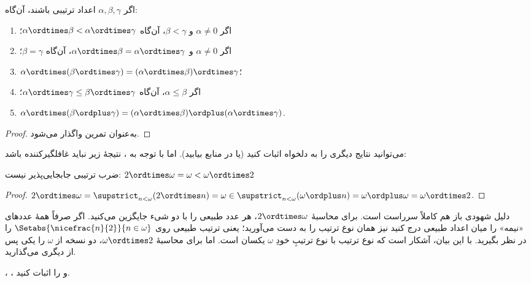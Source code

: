 \documentclass[../../../include/open-logic-section]{subfiles}
\begin{document}
\begin{lem}
اگر $\alpha, \beta, \gamma$ اعداد ترتیبی باشند، آن‌گاه:
\begin{enumerate}
	\item{} اگر $\alpha \neq 0$ و
	$\beta < \gamma$، آن‌گاه
	$\alpha \ordtimes \beta < \alpha \ordtimes \gamma$؛
	\item{} اگر $\alpha \neq 0$ و
	$\alpha \ordtimes \beta = \alpha\ordtimes\gamma$، آن‌گاه
	$\beta = \gamma$؛
	\item{}
	$\alpha \ordtimes (\beta \ordtimes \gamma) =
	(\alpha \ordtimes \beta) \ordtimes \gamma$؛
	\item{} اگر $\alpha \leq \beta$، آن‌گاه
	$\alpha \ordtimes \gamma \leq \beta \ordtimes \gamma$؛
	\item{}
	$\alpha \ordtimes (\beta \ordplus \gamma) =
	(\alpha \ordtimes \beta )\ordplus
	(\alpha\ordtimes \gamma)$.
\end{enumerate}
\end{lem}

\begin{proof}
به‌عنوان تمرین واگذار می‌شود.
\end{proof}

می‌توانید نتایج دیگری را به دلخواه اثبات کنید (یا در منابع
بیابید). اما با توجه به
، نتیجهٔ زیر نباید
غافلگیرکننده باشد:

\begin{prop}
ضرب ترتیبی جابجایی‌پذیر نیست:
$2 \ordtimes \omega = \omega < \omega \ordtimes 2$
\end{prop}

\begin{proof}
$2 \ordtimes \omega = \supstrict_{n < \omega}(2\ordtimes n) =
\omega \in \supstrict_{n < \omega}(\omega \ordplus n) =
\omega \ordplus \omega = \omega \ordtimes 2$.
\end{proof}
\noindent
دلیل شهودی باز هم کاملاً سرراست است. برای محاسبهٔ
$2 \ordtimes \omega$، هر عدد طبیعی را با دو شیء جایگزین می‌کنید.
اگر صرفاً همهٔ عددهای «نیمه» را میان اعداد طبیعی درج کنید نیز همان
نوع ترتیب را به دست می‌آورید؛ یعنی ترتیب طبیعی روی
$\Setabs{\nicefrac{n}{2}}{n \in \omega}$ را در نظر بگیرید. با این
بیان، آشکار است که نوع ترتیب با نوع ترتیبِ خودِ $\omega$ یکسان است.
اما برای محاسبهٔ $\omega \ordtimes 2$، دو نسخه از $\omega$ را
یکی پس از دیگری می‌گذارید.

\begin{prob}
،
،
و
را اثبات کنید.
\end{prob}
\end{document}
